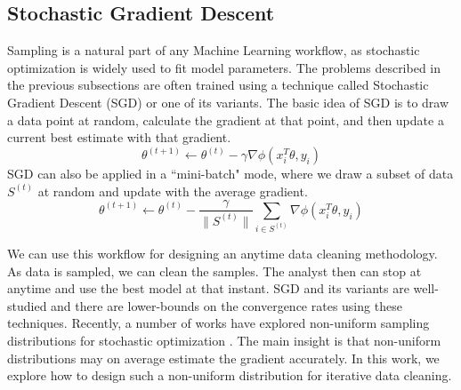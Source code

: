 \subsection{Stochastic Gradient Descent}
Sampling is a natural part of any Machine Learning workflow, as stochastic optimization is widely used to fit model parameters.
The problems described in the previous subsections are often trained using a technique called Stochastic Gradient Descent (SGD) or one of its variants.
The basic idea of SGD is to draw a data point at random, calculate the gradient at that point, and then update a current best estimate with that gradient.
\[
\theta^{(t+1)}\leftarrow\theta^{(t)}-\gamma\nabla\phi(x_{i}^T\theta,y_{i})
\]
 SGD can also be applied in a ``mini-batch" mode, where we draw a subset of data $S^{(t)}$ at random and update with the average gradient.
 \[
 \theta^{(t+1)}\leftarrow\theta^{(t)}-\frac{\gamma}{\|S^{(t)}\|}\sum_{i\in S^{(t)}}\nabla\phi(x_{i}^T\theta,y_{i})
 \]

We can use this workflow for designing an anytime data cleaning methodology.
As data is sampled, we can clean the samples.
The analyst then can stop at anytime and use the best model at that instant.
SGD and its variants are well-studied and there are lower-bounds on the convergence rates using these techniques. 
Recently, a number of works have explored non-uniform sampling distributions for stochastic optimization \cite{zhao2014stochastic, qu2014randomized}.
The main insight is that non-uniform distributions may on average estimate the gradient accurately.
In this work, we explore how to design such a non-uniform distribution for iterative data cleaning.

\fi


 